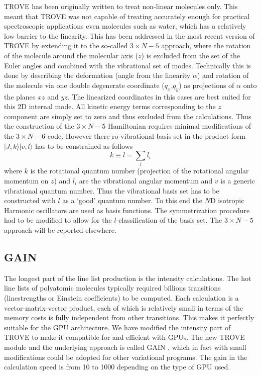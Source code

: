 \documentclass[12pt]{article}
\newcommand{\ket}[1]{\vert #1 \rangle  }
\newcommand{\2}{$_{2}$}
\newcommand{\3}{$_{3}$}
\newcommand{\4}{$_{4}$}
\begin{document}
TROVE has been originally written to treat non-linear molecules only.
This meant that TROVE was not capable of treating accurately enough
for practical spectroscopic applications even molecules such as water,
which has a relatively low barrier to the linearity.  This has been
addressed in the most recent version of TROVE by extending it to the
so-called $3\times N-5$ approach, where the rotation of the molecule
around the molecular axis ($z$) is excluded from the set of the Euler
angles and combined with the vibrational set of modes. Technically
this is done by describing the deformation (angle from the linearity
$\alpha$) and rotation of the molecule via one double degenerate
coordinate ($q_x$,$q_y$) as projections of $\alpha$ onto the planes
$xz$ and $yz$. The linearized coordinates in this cases are best
suited for this 2D internal mode. All kinetic energy terms
corresponding to the $z$ component are simply set to zero and thus
excluded from the calculations. Thus the construction of the $3\times
N-5$ Hamiltonian requires minimal modifications of the $3\times N-6$
code. However there ro-vibrational basis set in the product form
$\ket{J,k}\ket{v,l}$ has to be constrained as follows
\cite{70Watson.method}
$$
  k \equiv l = \sum_i l_i
$$
where $k$ is the rotational quantum number (projection of the rotational angular momentum on $z$) and $l_i$ are the vibrational angular momentum and $v$ is a generic vibrational quantum number. Thus the vibrational basis set has to be constructed with $l$ as a `good' quantum number. To this end the $N$D isotropic Harmonic oscillators are used as basis functions. The symmetrization procedure had to be modified to allow for the $l$-classification of the basis set. The $3\times N -5 $ approach will be reported elsewhere.


\subsection{GAIN}

The longest part of the line list production is the intensity calculations. The hot line lists of polyatomic molecules typically required billions transitions (linestrengths or Einstein coefficients) to be computed. Each calculation is a vector-matrix-vector product, each of which is relatively small in terms of the memory costs is fully independent from other transitions. This makes it perfectly suitable for the GPU architecture. We have modified the intensity part of TROVE to make it compatible for and efficient with GPUs. The new TROVE module  and the underlying approach is called GAIN \cite{jtGAIN}, which in fact with small modifications could be adopted for other variational programs. The gain in the calculation speed is from 10 to 1000 depending on the type of GPU used.
\end{document}
